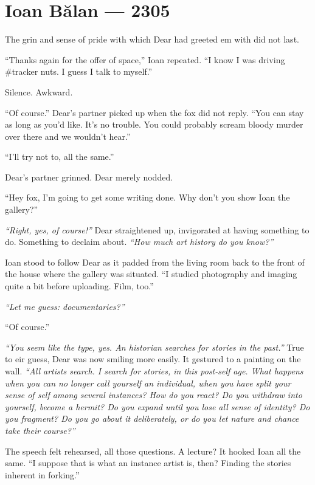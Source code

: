 \hypertarget{ioan-bux103lan-2305}{%
\chapter*{Ioan Bălan — 2305}\label{ioan-bux103lan-2305}}

The grin and sense of pride with which Dear had greeted em with did not last.

``Thanks again for the offer of space,'' Ioan repeated. ``I know I was driving \#tracker nuts. I guess I talk to myself.''

Silence. Awkward.

``Of course.'' Dear's partner picked up when the fox did not reply. ``You can stay as long as you'd like. It's no trouble. You could probably scream bloody murder over there and we wouldn't hear.''

``I'll try not to, all the same.''

Dear's partner grinned. Dear merely nodded.

``Hey fox, I'm going to get some writing done. Why don't you show Ioan the gallery?''

\emph{``Right, yes, of course!''} Dear straightened up, invigorated at having something to do. Something to declaim about. \emph{``How much art history do you know?''}

Ioan stood to follow Dear as it padded from the living room back to the front of the house where the gallery was situated. ``I studied photography and imaging quite a bit before uploading. Film, too.''

\emph{``Let me guess: documentaries?''}

``Of course.''

\emph{``You seem like the type, yes. An historian searches for stories in the past.''} True to eir guess, Dear was now smiling more easily. It gestured to a painting on the wall. \emph{``All artists search. I search for stories, in this post-self age. What happens when you can no longer call yourself an individual, when you have split your sense of self among several instances? How do you react? Do you withdraw into yourself, become a hermit? Do you expand until you lose all sense of identity? Do you fragment? Do you go about it deliberately, or do you let nature and chance take their course?''}

The speech felt rehearsed, all those questions. A lecture? It hooked Ioan all the same. ``I suppose that is what an instance artist is, then? Finding the stories inherent in forking.''

